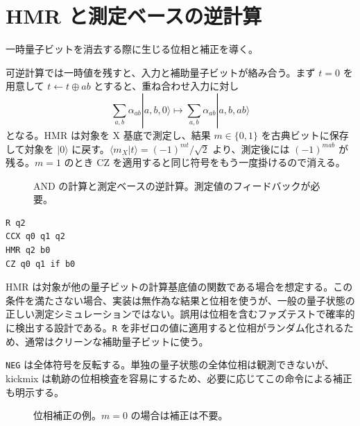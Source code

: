 \documentclass[a4paper,11pt,oneside,openany]{ltjsbook}
\newcommand{\code}[1]{\nolinkurl{#1}}
\begin{document}
\chapter{HMR と測定ベースの逆計算}
\begin{goal}一時量子ビットを消去する際に生じる位相と補正を導く。\end{goal}
可逆計算では一時値を残すと、入力と補助量子ビットが絡み合う。まず $t=0$ を用意して $t\leftarrow t\oplus ab$ とすると、重ね合わせ入力に対し
\begin{equation}\sum_{a,b} \alpha_{ab}|a,b,0\rangle\longmapsto\sum_{a,b}\alpha_{ab}|a,b,ab\rangle\end{equation}
となる。HMR は対象を X 基底で測定し、結果 $m\in\{0,1\}$ を古典ビットに保存して対象を $|0\rangle$ に戻す。$\langle m_X|t\rangle=(-1)^{mt}/\sqrt2$ より、測定後には $(-1)^{mab}$ が残る。$m=1$ のとき CZ を適用すると同じ符号をもう一度掛けるので消える。
\begin{figure}[htbp]\centering
{}\caption{AND の計算と測定ベースの逆計算。測定値のフィードバックが必要。}\end{figure}
\begin{lstlisting}
R q2
CCX q0 q1 q2
HMR q2 b0
CZ q0 q1 if b0
\end{lstlisting}
\begin{notice}
HMR は対象が他の量子ビットの計算基底値の関数である場合を想定する。この条件を満たさない場合、実装は無作為な結果と位相を使うが、一般の量子状態の正しい測定シミュレーションではない。誤用は位相を含むファズテストで確率的に検出する設計である。\code{R} を非ゼロの値に適用すると位相がランダム化されるため、通常はクリーンな補助量子ビットに使う。
\end{notice}
\code{NEG} は全体符号を反転する。単独の量子状態の全体位相は観測できないが、kickmix は軌跡の位相検査を容易にするため、必要に応じてこの命令による補正も明示する。
\begin{figure}[htbp]\centering
{}\caption{位相補正の例。$m=0$ の場合は補正は不要。}\end{figure}
\end{document}
